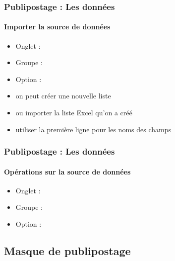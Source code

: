 \documentclass[xcolor=table]{beamer}
\begin{document}
\begin{frame}
\frametitle{Publipostage : Les données}
\framesubtitle{Importer la source de données}

\begin{minipage}{0.40\textwidth}
	\begin{itemize}
		\item Onglet : 
		\item Groupe : 
		\item Option : 
		\item on peut créer une nouvelle liste
		\item ou importer la liste Excel qu'on a créé
		\item utiliser la première ligne pour les noms des champs
	\end{itemize}
\end{minipage}
\begin{minipage}{0.59\textwidth}
	
\end{minipage}

\end{frame}

\begin{frame}
\frametitle{Publipostage : Les données}
\framesubtitle{Opérations sur la source de données}

\begin{minipage}{0.53\textwidth}
	\begin{itemize}
		\item Onglet : 
		\item Groupe : 
		\item Option : 
	\end{itemize}
\end{minipage}
\begin{minipage}{0.45\textwidth}
\end{minipage}


\end{frame}

\subsection{Masque de publipostage}
\end{document}
